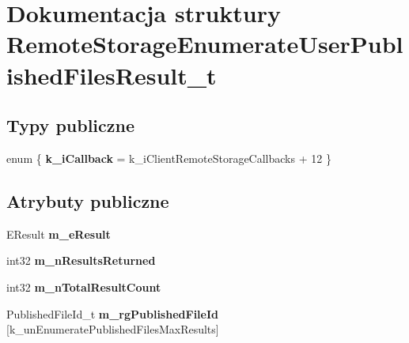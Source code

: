 \hypertarget{struct_remote_storage_enumerate_user_published_files_result__t}{}\section{Dokumentacja struktury Remote\+Storage\+Enumerate\+User\+Published\+Files\+Result\+\_\+t}
\label{struct_remote_storage_enumerate_user_published_files_result__t}
\subsection*{Typy publiczne}
\begin{DoxyCompactItemize}
\item 
\mbox{\label{struct_remote_storage_enumerate_user_published_files_result__t_a71e29b30e21235e53cca39243e7e3cab}} 
enum \{ {\bfseries k\+\_\+i\+Callback} = k\+\_\+i\+Client\+Remote\+Storage\+Callbacks + 12
 \}
\end{DoxyCompactItemize}
\subsection*{Atrybuty publiczne}
\begin{DoxyCompactItemize}
\item 
\mbox{\label{struct_remote_storage_enumerate_user_published_files_result__t_a58218037e715599b5242684613dde186}} 
E\+Result {\bfseries m\+\_\+e\+Result}
\item 
\mbox{\label{struct_remote_storage_enumerate_user_published_files_result__t_ab6ff1eb9aaf3b51bcaf6aac070e4bc80}} 
int32 {\bfseries m\+\_\+n\+Results\+Returned}
\item 
\mbox{\label{struct_remote_storage_enumerate_user_published_files_result__t_a02d38a487ff7bfba100c5c3d12f9cf86}} 
int32 {\bfseries m\+\_\+n\+Total\+Result\+Count}
\item 
\mbox{\label{struct_remote_storage_enumerate_user_published_files_result__t_aa865c8a8fcc40e8b72fdba5c0085930e}} 
Published\+File\+Id\+\_\+t {\bfseries m\+\_\+rg\+Published\+File\+Id} \mbox{[}k\+\_\+un\+Enumerate\+Published\+Files\+Max\+Results\mbox{]}
\end{DoxyCompactItemize}



